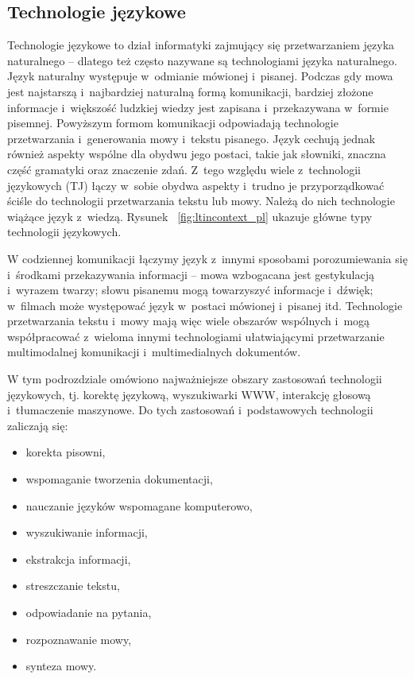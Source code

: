 \begin{multicols}{2} 

\subsection[Technologie językowe]{Technologie językowe} 

Technologie językowe to dział informatyki zajmujący się
przetwarzaniem języka naturalnego – dlatego też często nazywane
są technologiami języka naturalnego. Język naturalny występuje
w~odmianie mówionej i~pisanej. Podczas gdy mowa jest najstarszą
i~najbardziej naturalną formą komunikacji, bardziej złożone
informacje i~większość ludzkiej wiedzy jest zapisana i~przekazywana
w~formie pisemnej. Powyższym formom komunikacji odpowiadają
technologie przetwarzania i~generowania mowy i~tekstu pisanego. Język
cechują jednak również aspekty wspólne dla obydwu jego postaci,
takie jak słowniki, znaczna część gramatyki oraz znaczenie zdań.
Z~tego względu wiele z~technologii językowych (TJ) łączy w~sobie
obydwa aspekty i~trudno je przyporządkować ściśle do technologii
przetwarzania tekstu lub mowy. Należą do nich technologie wiążące
język z~wiedzą. Rysunek ~\ref{fig:ltincontext_pl} ukazuje główne
typy technologii językowych. 

W codziennej komunikacji łączymy język z~innymi sposobami
porozumiewania się i~środkami przekazywania informacji – mowa
wzbogacana jest gestykulacją i~wyrazem twarzy; słowu pisanemu mogą
towarzyszyć informacje i~dźwięk; w~filmach może występować
język w~postaci mówionej i~pisanej itd. Technologie przetwarzania
tekstu i~mowy mają więc wiele obszarów wspólnych i~mogą
współpracować z~wieloma innymi technologiami ułatwiającymi
przetwarzanie multimodalnej komunikacji i~multimedialnych dokumentów. 

W tym podrozdziale omówiono najważniejsze obszary zastosowań
technologii językowych, tj. korektę językową, wyszukiwarki WWW,
interakcję głosową i~tłumaczenie maszynowe. Do tych zastosowań
i~podstawowych technologii zaliczają się: \begin{itemize} \item
korekta pisowni, \item wspomaganie tworzenia dokumentacji, \item
nauczanie języków wspomagane komputerowo, \item wyszukiwanie
informacji, \item ekstrakcja informacji, \item streszczanie tekstu,
\item odpowiadanie na pytania, \item rozpoznawanie mowy, \item synteza
mowy. \end{itemize} 


\end{multicols}
